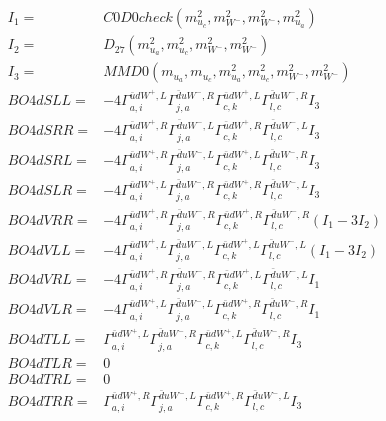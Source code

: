 \documentclass[A4,landscape]{article}
\begin{document}
\begin{align} 
I_1 = & C0D0check(m^2_{u_{{c}}}, m^2_{W^-}, m^2_{W^-}, m^2_{u_{{a}}}) \\ 
I_2 = & D_{27}(m^2_{u_{{a}}}, m^2_{u_{{c}}}, m^2_{W^-}, m^2_{W^-}) \\ 
I_3 = & MMD0(m_{u_{{a}}}, m_{u_{{c}}}, m^2_{u_{{a}}}, m^2_{u_{{c}}}, m^2_{W^-}, m^2_{W^-}) \\ 
  BO4dSLL= & -4  \Gamma^{\bar{u}d W^+,L}_{a, i} \Gamma^{\bar{d}u W^- ,R}_{j, a} \Gamma^{\bar{u}d W^+,L}_{c, k} \Gamma^{\bar{d}u W^- ,R}_{l, c} I_3 \\ 
  BO4dSRR= & -4  \Gamma^{\bar{u}d W^+,R}_{a, i} \Gamma^{\bar{d}u W^- ,L}_{j, a} \Gamma^{\bar{u}d W^+,R}_{c, k} \Gamma^{\bar{d}u W^- ,L}_{l, c} I_3 \\ 
  BO4dSRL= & -4  \Gamma^{\bar{u}d W^+,R}_{a, i} \Gamma^{\bar{d}u W^- ,L}_{j, a} \Gamma^{\bar{u}d W^+,L}_{c, k} \Gamma^{\bar{d}u W^- ,R}_{l, c} I_3 \\ 
  BO4dSLR= & -4  \Gamma^{\bar{u}d W^+,L}_{a, i} \Gamma^{\bar{d}u W^- ,R}_{j, a} \Gamma^{\bar{u}d W^+,R}_{c, k} \Gamma^{\bar{d}u W^- ,L}_{l, c} I_3 \\ 
  BO4dVRR= & -4  \Gamma^{\bar{u}d W^+,R}_{a, i} \Gamma^{\bar{d}u W^- ,R}_{j, a} \Gamma^{\bar{u}d W^+,R}_{c, k} \Gamma^{\bar{d}u W^- ,R}_{l, c} (I_1 - 3 I_2) \\ 
  BO4dVLL= & -4  \Gamma^{\bar{u}d W^+,L}_{a, i} \Gamma^{\bar{d}u W^- ,L}_{j, a} \Gamma^{\bar{u}d W^+,L}_{c, k} \Gamma^{\bar{d}u W^- ,L}_{l, c} (I_1 - 3 I_2) \\ 
  BO4dVRL= & -4  \Gamma^{\bar{u}d W^+,R}_{a, i} \Gamma^{\bar{d}u W^- ,R}_{j, a} \Gamma^{\bar{u}d W^+,L}_{c, k} \Gamma^{\bar{d}u W^- ,L}_{l, c} I_1 \\ 
  BO4dVLR= & -4  \Gamma^{\bar{u}d W^+,L}_{a, i} \Gamma^{\bar{d}u W^- ,L}_{j, a} \Gamma^{\bar{u}d W^+,R}_{c, k} \Gamma^{\bar{d}u W^- ,R}_{l, c} I_1 \\ 
  BO4dTLL= &  \Gamma^{\bar{u}d W^+,L}_{a, i} \Gamma^{\bar{d}u W^- ,R}_{j, a} \Gamma^{\bar{u}d W^+,L}_{c, k} \Gamma^{\bar{d}u W^- ,R}_{l, c} I_3 \\ 
  BO4dTLR= & 0 \\ 
  BO4dTRL= & 0 \\ 
  BO4dTRR= &  \Gamma^{\bar{u}d W^+,R}_{a, i} \Gamma^{\bar{d}u W^- ,L}_{j, a} \Gamma^{\bar{u}d W^+,R}_{c, k} \Gamma^{\bar{d}u W^- ,L}_{l, c} I_3 \\ 
\end{align} 
\end{document}
